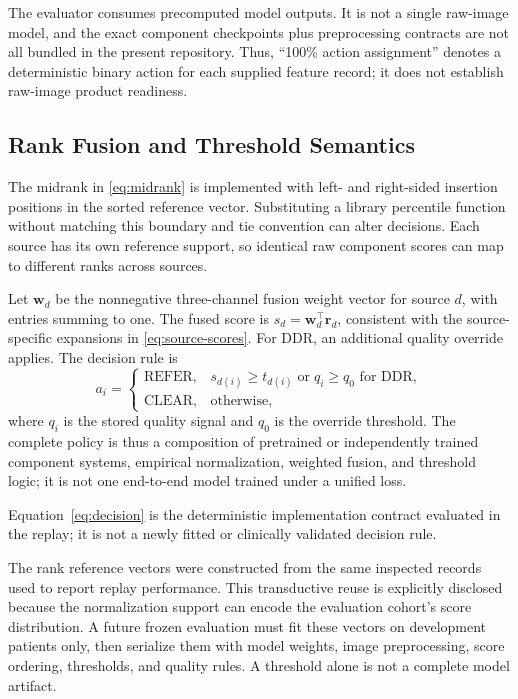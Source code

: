 \documentclass{ieeeaccess}
\begin{document}
The evaluator consumes precomputed model outputs. It is not a single raw-image model, and the exact component checkpoints plus preprocessing contracts are not all bundled in the present repository. Thus, ``100\% action assignment'' denotes a deterministic binary action for each supplied feature record; it does not establish raw-image product readiness.

\subsection{Rank Fusion and Threshold Semantics}
The midrank in \eqref{eq:midrank} is implemented with left- and right-sided insertion positions in the sorted reference vector. Substituting a library percentile function without matching this boundary and tie convention can alter decisions. Each source has its own reference support, so identical raw component scores can map to different ranks across sources.

Let $\boldsymbol{w}_d$ be the nonnegative three-channel fusion weight vector for source $d$, with entries summing to one. The fused score is $s_d=\boldsymbol{w}_d^\top\boldsymbol{r}_d$, consistent with the source-specific expansions in \eqref{eq:source-scores}. For DDR, an additional quality override applies. The decision rule is
\begin{equation}
 a_i=\begin{cases}\mathrm{REFER},&s_{d(i)}\ge t_{d(i)}\;\text{or}\;q_i\ge q_0\text{ for DDR},\\
 \mathrm{CLEAR},&\text{otherwise},\end{cases}
\label{eq:decision}
\end{equation}
where $q_i$ is the stored quality signal and $q_0$ is the override threshold. The complete policy is thus a composition of pretrained or independently trained component systems, empirical normalization, weighted fusion, and threshold logic; it is not one end-to-end model trained under a unified loss.

Equation~\eqref{eq:decision} is the deterministic implementation contract evaluated in the replay; it is not a newly fitted or clinically validated decision rule.

The rank reference vectors were constructed from the same inspected records used to report replay performance. This transductive reuse is explicitly disclosed because the normalization support can encode the evaluation cohort's score distribution. A future frozen evaluation must fit these vectors on development patients only, then serialize them with model weights, image preprocessing, score ordering, thresholds, and quality rules. A threshold alone is not a complete model artifact.
\end{document}
